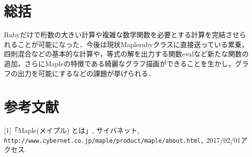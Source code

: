 \documentclass[10pt,a4j,twocolumn]{jsarticle}
\begin{document}
\section{総括}
Rubyだけで桁数の大きい計算や複雑な数学関数を必要とする計算を完結させられることが可能になった．今後は現状Maplerubyクラスに直接送っている累乗，四則混合などの基本的な計算や，等式の解を出力する関数evalなど新たな関数の追加，さらにMapleの特徴である綺麗なグラフ描画ができることを生かし，グラフの出力を可能にするなどの課題が挙げられる．

\section{参考文献}
[1]「Maple(メイプル) とは」, サイバネット, \verb|http://www.cybernet.co.jp/maple/product/maple/about.html,| 2017/02/01アクセス.
\end{document}
